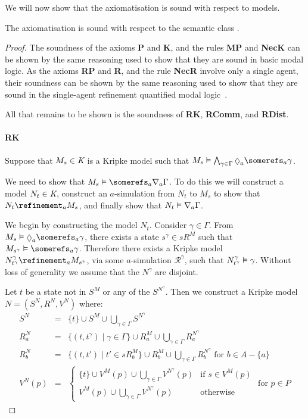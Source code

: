 We will now show that the axiomatisation is sound with respect to \classK{}
models.

\begin{lemma}\label{k-sound}
The axiomatisation \axiomKF{} is sound with respect to the semantic class
\classK{}.
\end{lemma}

\begin{proof}
The soundness of the axioms {\bf P} and {\bf K}, and the rules {\bf MP} and
{\bf NecK} can be shown by the same reasoning used to show that they are sound
in basic modal logic. As the axioms {\bf RP} and {\bf R}, and the rule {\bf
NecR} involve only a single agent, their soundness can be shown by the same
reasoning used to show that they are sound in the single-agent refinement
quantified modal logic~\cite{french2010future}.

All that remains to be shown is the soundness of {\bf RK}, {\bf RComm}, and {\bf
RDist}.

\paragraph{RK}
Suppose that $M_s \in \textit{K}$ is a Kripke model such that $M_s \entails
\bigwedge_{\gamma \in \Gamma} \suspects_a \somerefs_a \gamma$.

We need to show that $M_s \entails \somerefs_a \covers_a \Gamma$. To do this we
will construct a model $N_t \in \textit{K}$, construct an $a$-simulation from $N_t$
to $M_s$ to show that $N_t \refinement_a M_s$, and finally show that $N_t
\vDash \nabla_a \Gamma$.

We begin by constructing the model $N_t$. Consider $\gamma \in \Gamma$. From
$M_s \entails \suspects_a \somerefs_a \gamma$, there exists a state $s^\gamma
\in sR^M$ such that $M_{s^\gamma} \entails \somerefs_a \gamma$. Therefore there
exists a Kripke model $N^\gamma_{t^\gamma} \refinement_a M_{s^\gamma}$, via some
$a$-simulation $\mathcal{R}^\gamma$, such that $N^\gamma_{t^\gamma} \vDash
\gamma$. Without loss of generality we assume that the $N^\gamma$ are disjoint.

Let $t$ be a state not in $S^M$ or any of the $S^{N^\gamma}$. Then we construct a
Kripke model $N = (S^N, R^N, V^N)$ where:
\begin{eqnarray*}
S^N &=& \{t\} \cup S^M \cup \bigcup_{\gamma \in \Gamma} S^{N^\gamma}\\
R^N_a &=& \{(t, t^\gamma) \mid \gamma \in \Gamma\}
\cup R^M_a
\cup \bigcup_{\gamma \in \Gamma} R^{N^\gamma}_a\\
R^N_b &=& \{(t, t') \mid t' \in sR^M_b\}
\cup R^M_b
\cup \bigcup_{\gamma \in \Gamma} R^{N^\gamma}_b \text{ for $b \in A - \{a\}$}\\
V^N(p) &=& 
\begin{cases}
\displaystyle \{t\} \cup V^M(p) \cup \bigcup_{\gamma \in \Gamma} V^{N^\gamma}(p) & \text{if $s
\in V^M(p)$}\\
\displaystyle V^M(p) \cup \bigcup_{\gamma \in \Gamma} V^{N^\gamma}(p) & \text{otherwise}
\end{cases}
\text{ for $p \in P$}
\end{eqnarray*}


\end{proof}
